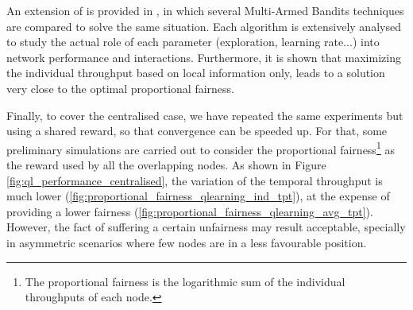 \documentclass[12pt, a4paper,twoside]{tesi_upf}
\begin{document}
			An extension of \cite{wilhelmi2017implications} is provided in \cite{wilhelmi2017enhancing}, in which several Multi-Armed Bandits techniques are compared to solve the same situation. Each algorithm is extensively analysed to study the actual role of each parameter (exploration, learning rate...) into network performance and interactions. Furthermore, it is shown that maximizing the individual throughput based on local information only, leads to a solution very close to the optimal proportional fairness.			
			
			Finally, to cover the centralised case, we have repeated the same experiments but using a shared reward, so that convergence can be speeded up. For that, some preliminary simulations are carried out to consider the proportional fairness\footnote{The proportional fairness is the logarithmic sum of the individual throughputs of each node.} as the reward used by all the overlapping nodes. As shown in Figure \ref{fig:ql_performance_centralised}, the variation of the temporal throughput is much lower (\ref{fig:proportional_fairness_qlearning_ind_tpt}), at the expense of providing a lower fairness (\ref{fig:proportional_fairness_qlearning_avg_tpt}). However, the fact of suffering a certain unfairness may result acceptable, specially in asymmetric scenarios where few nodes are in a less favourable position.
\end{document}
